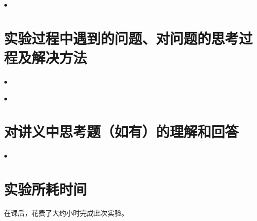 \documentclass[11pt]{article}
\begin{document}
\newcommand{\name}{}
\newcommand{\studentNum}{}
\newcommand{\major}{计算机科学与技术}
\newcommand{\labNum}{}
\newcommand{\labName}{}



\section{}

\noindent
$\bullet$
\textbf{}

\section{实验过程中遇到的问题、对问题的思考过程及解决方法}


\noindent
$\bullet$
\textbf{}

\vspace{1ex}

\noindent
$\bullet$
\textbf{}

\section{对讲义中思考题（如有）的理解和回答}

\noindent
$\bullet$
\textbf{}


\vspace{1ex}

\section{实验所耗时间}

\newcommand{\labTime}{5}

在课后，花费了大约\underline{\makebox[5em][c]{\labTime}}小时完成此次实验。
\end{document}
